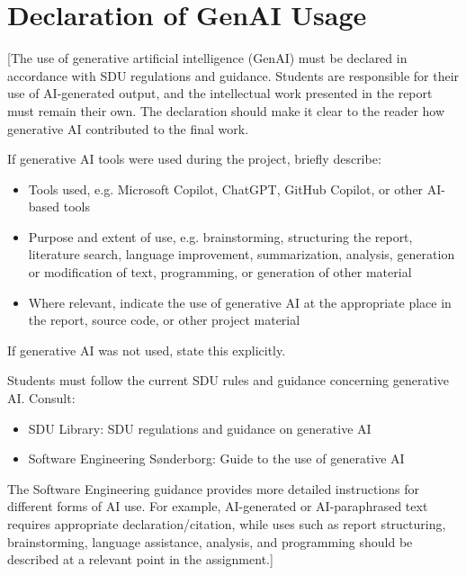 \chapter*{Declaration of GenAI Usage}

[The use of generative artificial intelligence (GenAI) must be declared in accordance with SDU regulations and guidance. Students are responsible for their use of AI-generated output, and the intellectual work presented in the report must remain their own. The declaration should make it clear to the reader how generative AI contributed to the final work.

If generative AI tools were used during the project, briefly describe:
\begin{itemize}
    \item Tools used, e.g. Microsoft Copilot, ChatGPT, GitHub Copilot, or other AI-based tools
    \item Purpose and extent of use, e.g. brainstorming, structuring the report, literature search, language improvement, summarization, analysis, generation or modification of text, programming, or generation of other material
    \item Where relevant, indicate the use of generative AI at the appropriate place in the report, source code, or other project material
\end{itemize}

If generative AI was not used, state this explicitly.

Students must follow the current SDU rules and guidance concerning generative AI. Consult:
\begin{itemize}
    \item SDU Library: SDU regulations and guidance on generative AI
    \item Software Engineering S\o{}nderborg: Guide to the use of generative AI
\end{itemize}

The Software Engineering guidance provides more detailed instructions for different forms of AI use. For example, AI-generated or AI-paraphrased text requires appropriate declaration/citation, while uses such as report structuring, brainstorming, language assistance, analysis, and programming should be described at a relevant point in the assignment.]
